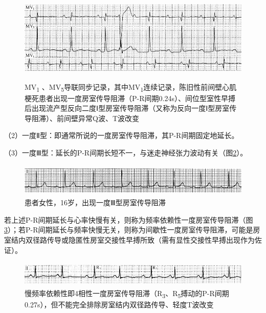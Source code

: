 \begin{figure}[!htbp]
 \centering
 \includegraphics[width=5.58333in,height=1.70833in]{./images/Image00331.jpg}
 \captionsetup{justification=centering}
 \caption{MV\textsubscript{1} 、MV\textsubscript{5}导联同步记录，其中MV\textsubscript{1}连续记录，陈旧性前间壁心肌梗死患者出现一度房室传导阻滞（P-R间期0.24s）、间位型室性早搏后出现流产型反向二度Ⅰ型房室传导阻滞（又称为反向一度Ⅰ型房室传导阻滞）、前间壁异常Q波、T波改变}
 \label{fig20-2}
  \end{figure} 


（2）一度Ⅱ型：即通常所说的一度房室传导阻滞，其P-R间期固定地延长。

（3）一度Ⅲ型：延长的P-R间期长短不一，与迷走神经张力波动有关（图\ref{fig20-3}）。

\begin{figure}[!htbp]
 \centering
 \includegraphics[width=5.58333in,height=0.61458in]{./images/Image00332.jpg}
 \captionsetup{justification=centering}
 \caption{患者女性，16岁，出现一度Ⅲ型房室传导阻滞}
 \label{fig20-3}
  \end{figure} 

若上述P-R间期延长与心率快慢有关，则称为频率依赖性一度房室传导阻滞（图\ref{fig20-4}）；若P-R间期延长与频率快慢无关，则称为间歇性一度房室传导阻滞，可能是房室结内双径路传导或隐匿性房室交接性早搏所致（需有显性交接性早搏出现作为佐证）。

\begin{figure}[!htbp]
 \centering
 \includegraphics[width=5.58333in,height=0.47917in]{./images/Image00333.jpg}
 \captionsetup{justification=centering}
 \caption{慢频率依赖性即4相性一度房室传导阻滞（R\textsubscript{3}、R\textsubscript{5}搏动的P-R间期0.27s），但不能完全排除房室结内双径路传导、轻度T波改变}
 \label{fig20-4}
  \end{figure} 


